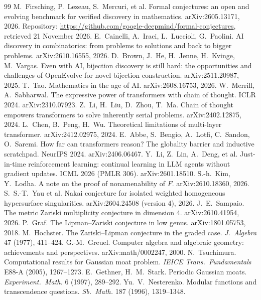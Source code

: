 \documentclass[11pt,a4paper]{article}
\theoremstyle{prob}
\begin{document}
\begin{thebibliography}{99}
 M.~Firsching, P.~Lezeau, S.~Mercuri, et al. Formal conjectures: an open and evolving benchmark for verified discovery in mathematics. arXiv:2605.13171, 2026. Repository: \url{https://github.com/google-deepmind/formal-conjectures}, retrieved 21 November 2026.
 E.~Cainelli, A.~Iraci, L.~Luccioli, G.~Paolini. AI discovery in combinatorics: from problems to solutions and back to bigger problems. arXiv:2610.16555, 2026.
 D.~Brown, J.~He, H.~Jenne, H.~Kvinge, M.~Vargas. Even with AI, bijection discovery is still hard: the opportunities and challenges of OpenEvolve for novel bijection construction. arXiv:2511.20987, 2025.
 T.~Tao. Mathematics in the age of AI. arXiv:2608.16753, 2026.
 W.~Merrill, A.~Sabharwal. The expressive power of transformers with chain of thought. ICLR 2024. arXiv:2310.07923.
 Z.~Li, H.~Liu, D.~Zhou, T.~Ma. Chain of thought empowers transformers to solve inherently serial problems. arXiv:2402.12875, 2024.
 L.~Chen, B.~Peng, H.~Wu. Theoretical limitations of multi-layer transformer. arXiv:2412.02975, 2024.
 E.~Abbe, S.~Bengio, A.~Lotfi, C.~Sandon, O.~Saremi. How far can transformers reason? The globality barrier and inductive scratchpad. NeurIPS 2024. arXiv:2406.06467.
 Y.~Li, Z.~Lin, A.~Deng, et al. Just-in-time reinforcement learning: continual learning in LLM agents without gradient updates. ICML 2026 (PMLR 306). arXiv:2601.18510.
 S.-h.~Kim, Y.~Lodha. A note on the proof of nonamenability of $F$. arXiv:2610.18360, 2026.
 S.~S.-T.~Yau et al. Nakai conjecture for isolated weighted homogeneous hypersurface singularities. arXiv:2604.24508 (version 4), 2026.
 J.~E.~Sampaio. The metric Zariski multiplicity conjecture in dimension 4. arXiv:2610.41954, 2026.
 P.~Graf. The Lipman--Zariski conjecture in low genus. arXiv:1801.05753, 2018.
 M.~Hochster. The Zariski--Lipman conjecture in the graded case. \emph{J.\ Algebra} 47 (1977), 411--424.
 G.-M.~Greuel. Computer algebra and algebraic geometry: achievements and perspectives. arXiv:math/0002247, 2000.
 N.~Tsuchimura. Computational results for Gaussian moat problem. \emph{IEICE Trans.\ Fundamentals} E88-A (2005), 1267--1273.
 E.~Gethner, H.~M.~Stark. Periodic Gaussian moats. \emph{Experiment.\ Math.} 6 (1997), 289--292.
 Yu.~V.~Nesterenko. Modular functions and transcendence questions. \emph{Sb.\ Math.} 187 (1996), 1319--1348.

\end{thebibliography}
\end{document}
